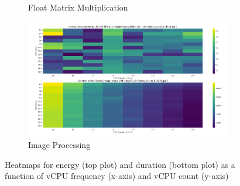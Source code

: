 \documentclass[times, 10pt,twocolumn]{article}
\begin{document}
\begin{figure}[ht]
\begin{subfigure}[b]{0.33\textwidth}
     \caption{Float Matrix Multiplication}
     \label{fig:energy_floatmatmult}
   \end{subfigure}
   \hfill
   \begin{subfigure}[b]{0.33\textwidth}
      \includegraphics[width=\textwidth]{imgs/study_1_results/heatmaps/energy_image.png}
     \caption{Image Processing}
     \label{fig:energy_image}
   \end{subfigure}
   \caption{Heatmaps for energy (top plot) and duration (bottom plot) as a function of vCPU frequency (x-axis) and vCPU count (y-axis)}
   \label{fig:energy_duration_heatmaps} %
\end{figure}
\end{document}

